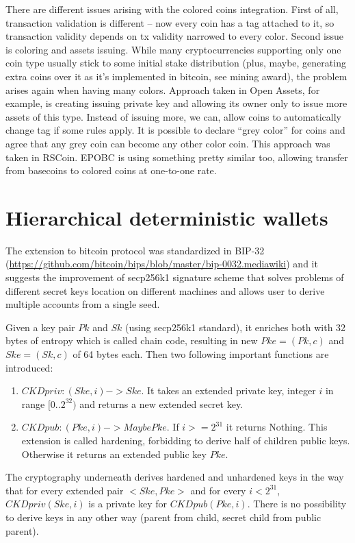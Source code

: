 \documentclass[]{itmo-student-thesis}
\begin{document}
There are different issues arising with the colored coins
integration. First of all, transaction validation is different -- now
every coin has a tag attached to it, so transaction validity depends
on tx validity narrowed to every color. Second issue is coloring and
assets issuing. While many cryptocurrencies supporting only one coin
type usually stick to some initial stake distribution (plus, maybe,
generating extra coins over it as it’s implemented in bitcoin, see
mining award), the problem arises again when having many
colors. Approach taken in Open Assets, for example, is creating
issuing private key and allowing its owner only to issue more assets
of this type. Instead of issuing more, we can, allow coins to
automatically change tag if some rules apply. It is possible to
declare “grey color” for coins and agree that any grey coin can become
any other color coin. This approach was taken in RSCoin. EPOBC is
using something pretty similar too, allowing transfer from basecoins
to colored coins at one-to-one rate.

\section{Hierarchical deterministic wallets}

The extension to bitcoin protocol was standardized in BIP-32
(\url{https://github.com/bitcoin/bips/blob/master/bip-0032.mediawiki})
and it suggests the improvement of secp256k1 signature scheme that
solves problems of different secret keys location on different
machines and allows user to derive multiple accounts from a single
seed.

Given a key pair $Pk$ and $Sk$ (using secp256k1 standard), it enriches
both with 32 bytes of entropy which is called chain code, resulting in
new $Pke = (Pk, c)$ and $Ske = (Sk, c)$ of 64 bytes each. Then two
following important functions are introduced:
\begin{enumerate}
\item $CKDpriv : (Ske, i) -> Ske$. It takes an extended private key,
  integer $i$ in range $[0..2^{32})$ and returns a new extended secret
  key.
\item $CKDpub : (Pke, i) -> Maybe Pke$. If $i >= 2^{31}$ it returns
  Nothing. This extension is called hardening, forbidding to derive
  half of children public keys. Otherwise it returns an extended
  public key $Pke$.
\end{enumerate}

The cryptography underneath derives hardened and unhardened keys in
the way that for every extended pair $<Ske,Pke>$ and for every $i <
2^{31}$, $CKDpriv(Ske,i)$ is a private key for $CKDpub(Pke,i)$. There is
no possibility to derive keys in any other way (parent from child,
secret child from public parent).
\end{document}
